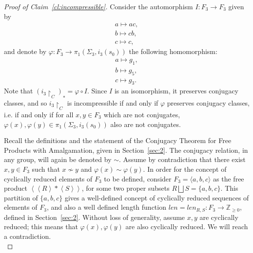 \documentclass[11pt]{article}
\newenvironment{myequation}
    {
        \begin{equation*}
        \begin{gathered}
    }
    { 
        \end{gathered} 
        \end{equation*}
    }
\newcommand{\Z}{\mathbb{Z}}
\begin{document}
        \begin{proof}[Proof of Claim~\ref{cl:incompressible}]
            Consider the automorphism $I: F_3 \to F_3$ given by
            \begin{myequation}
                a \mapsto ac ,\\
                b \mapsto cb ,\\
                c \mapsto c ,
            \end{myequation}
            and denote by $\varphi: F_3 \to \pi_1(\Sigma_3,i_3(s_0))$ the following homomorphism:
            \begin{myequation}
                a \mapsto g_1 ,\\
                b \mapsto g_5 ,\\
                c \mapsto g_3 .
            \end{myequation}
            Note that $(i_3 \restriction_C)_* = \varphi \circ I$. Since $I$ is an isomorphism, it preserves conjugacy classes, and so $i_3 \restriction_C$ is incompressible if and only if $\varphi$ preserves conjugacy classes, i.e. if and only if for all $x,y \in F_3$ which are not conjugates, $\varphi(x),\varphi(y) \in \pi_1(\Sigma_3,i_3(s_0))$ also are not conjugates.
            
            Recall the definitions and the statement of the Conjugacy Theorem for Free Products with Amalgamation, given in Section~\ref{sec:2}. The conjugacy relation, in any group, will again be denoted by $\sim$. Assume by contradiction that there exist $x,y \in F_3$ such that $x \not\sim y$ and $\varphi(x) \sim \varphi(y)$. In order for the concept of cyclically reduced elements of $F_3$ to be defined, consider $F_3 = \langle a,b,c \rangle$ as the free product $\left \langle \left \langle R \right \rangle * \left \langle S \right \rangle \right \rangle$, for some two proper subsets $R \bigsqcup S = \{a,b,c\}$. This partition of $\{a,b,c\}$ gives a well-defined concept of cyclically reduced sequences of elements of $F_3$, and also a well defined length function $len = len_{R,S} : F_3 \to \Z_{\geq 0}$, defined in Section~\ref{sec:2}. Without loss of generality, assume $x,y$ are cyclically reduced; this means that $\varphi(x), \varphi(y)$ are also cyclically reduced. We will reach a contradiction. \\
            

\end{proof}
\end{document}
